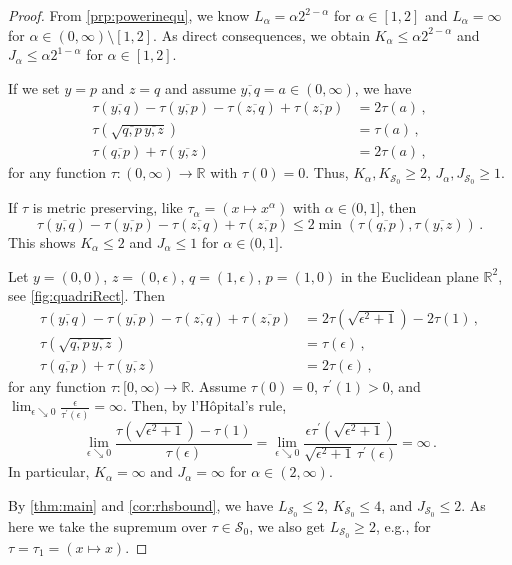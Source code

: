 \documentclass{article}
\newcommand{\lb}{\left(} %
\newcommand{\rb}{\right)} %
\newcommand{\br}[1]{\lb #1 \rb} %
\newcommand{\brOf}[1]{\!\br{#1}} %
\newcommand*{\mc}[1]{\mathcal{#1}}
\newcommand{\R}{\mathbb{R}}
\newcommand{\Rp}{[0, \infty)} %
\newcommand{\Rpp}{(0, \infty)} %
\newcommand{\pr}{^\prime}
\newcommand{\equationFullstop}{\, .}
\newcommand{\eqfs}{\equationFullstop}
\newcommand{\equationComma}{\, ,}
\newcommand{\eqcm}{\equationComma}
\newcommand{\ol}[2]{\overline{#1,#2}}
\newcommand{\tran}{\tau}
\newcommand{\dtran}{\tran\pr}
\newcommand{\setcco}{\mc S_0}
\begin{document}
%
\begin{proof}
	From \cref{prp:powerinequ}, we know $L_\alpha = \alpha 2^{2-\alpha}$ for $\alpha\in[1,2]$ and $L_\alpha = \infty$ for $\alpha\in\Rpp\setminus[1,2]$. As direct consequences, we obtain $K_\alpha \leq \alpha 2^{2-\alpha}$ and $J_\alpha \leq \alpha 2^{1-\alpha}$ for $\alpha\in[1,2]$.
	
	If we set $y = p$ and $z = q$ and assume $\ol yq = a \in \Rpp$, we have 
	\begin{align*}
		\tran(\ol yq) - \tran(\ol yp) - \tran(\ol zq) + \tran(\ol zp) &= 2 \tran(a)\eqcm\\
		\tran(\sqrt{\ol {q}{p}\,\ol {y}{z}})  &=  \tran(a) \eqcm\\
		\tran(\ol {q}{p}) + \tran(\ol {y}{z})  &=  2\tran(a) \eqcm
	\end{align*}
	for any function $\tran\colon\Rpp\to\R$ with $\tran(0) = 0$.
	Thus, $K_\alpha, K_{\setcco} \geq 2$, $J_\alpha, J_{\setcco} \geq 1$.
	
	If $\tran$ is metric preserving, like $\tran_\alpha = (x\mapsto x^\alpha)$ with $\alpha\in(0,1]$, then 
	\begin{equation}
		\tran(\ol yq) - \tran(\ol yp) - \tran(\ol zq) + \tran(\ol zp) \leq 2\min\brOf{\tran(\ol qp), \tran(\ol yz)}
		\eqfs
	\end{equation}
	This shows $K_\alpha \leq 2$ and $J_\alpha \leq 1$ for $\alpha\in(0,1]$.
	
	Let $y = (0,0)$, $z = (0,\epsilon)$, $q = (1,\epsilon)$, $p = (1, 0)$ in the Euclidean plane $\R^2$, see \cref{fig:quadriRect}. Then 
	\begin{align*}
		\tran(\ol yq) - \tran(\ol yp) - \tran(\ol zq) + \tran(\ol zp) &= 2 \tran(\sqrt{\epsilon^2+1}) - 2 \tran(1)\eqcm\\
		\tran(\sqrt{\ol {q}{p}\,\ol {y}{z}})  &=  \tran(\epsilon) \eqcm\\
		\tran(\ol {q}{p}) + \tran(\ol {y}{z})  &=  2\tran(\epsilon) \eqcm
	\end{align*}
	for any function $\tran\colon\Rp\to\R$.
	Assume $\tran(0) = 0$, $\dtran(1) > 0$, and $\lim_{\epsilon\searrow0} \frac{\epsilon}{\dtran(\epsilon)} = \infty$. Then, by l'Hôpital's rule, 
	\begin{equation}
		\lim_{\epsilon\searrow0} \frac{\tran(\sqrt{\epsilon^2+1}) - \tran(1)}{\tran(\epsilon)}
		= 
		\lim_{\epsilon\searrow0} \frac{\epsilon \dtran(\sqrt{\epsilon^2+1})}{\sqrt{\epsilon^2+1}\,\dtran(\epsilon)}
		= \infty\eqfs
	\end{equation}
	In particular, $K_\alpha = \infty$ and $J_\alpha = \infty$ for $\alpha\in(2,\infty)$.
	
	By \cref{thm:main} and \cref{cor:rhsbound}, we have $L_{\setcco} \leq 2$, $K_{\setcco} \leq 4$, and $J_{\setcco} \leq 2$. As here we take the supremum over $\tran\in\setcco$, we also get $L_{\setcco} \geq 2$, e.g., for $\tran = \tran_1 = (x\mapsto x)$.
\end{proof}
\end{document}
